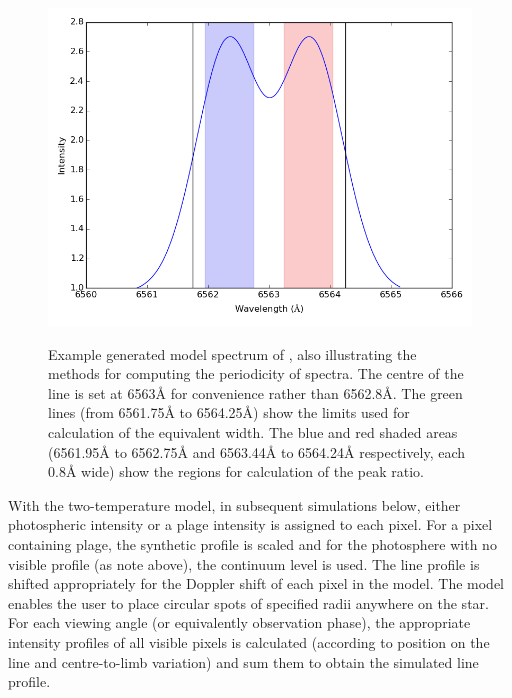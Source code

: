 \begin{figure}[!htbp]
\begin{center}
\includegraphics[scale=0.40]{Figures/integregions.png} \\
\end{center}
\caption{Example generated model spectrum of \prox, also illustrating the methods for computing the periodicity of
  spectra.  The centre of the \ha{} line is set at 6563{\AA} for convenience rather than 6562.8\AA{}.  The green lines
  (from 6561.75{\AA} to 6564.25\AA) show the limits used for calculation of the equivalent width. The blue and red
  shaded areas (6561.95{\AA} to 6562.75{\AA} and 6563.44{\AA} to 6564.24{\AA} respectively, each 0.8{\AA} wide) show the
  regions for calculation of the peak ratio.}
\protect\label{fig:integregions}
\end{figure}

With the two-temperature model, in subsequent simulations below, either photospheric intensity or a plage intensity is
assigned to each pixel. For a pixel containing plage, the synthetic {\ha} profile is scaled and for the photosphere with
no visible profile (as note above), the continuum level is used. The line profile is shifted appropriately for the
Doppler shift of each pixel in the model. The model enables the user to place circular spots of specified radii anywhere
on the star. For each viewing angle (or equivalently observation phase), the appropriate intensity profiles of all
visible pixels is calculated (according to position on the line and centre-to-limb variation) and sum them to obtain
the simulated line profile.


